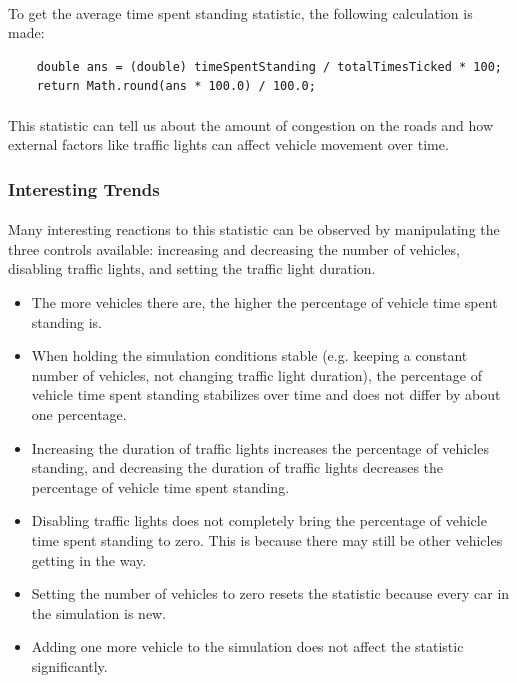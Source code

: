 \documentclass[a4paper,11pt,titlepage]{article}
\begin{document}
\paragraph{}
To get the average time spent standing statistic, the following calculation is made:
\begin{lstlisting}
	double ans = (double) timeSpentStanding / totalTimesTicked * 100;
	return Math.round(ans * 100.0) / 100.0;
\end{lstlisting}
\paragraph{}
This statistic can tell us about the amount of congestion on the roads and how external factors like traffic lights can affect vehicle movement over time.

\subsubsection{Interesting Trends}
\paragraph{}
Many interesting reactions to this statistic can be observed by manipulating the three controls available: increasing and decreasing the number of vehicles, disabling traffic lights, and setting the traffic light duration.
\begin{itemize}
\item The more vehicles there are, the higher the percentage of vehicle time spent standing is.
\item When holding the simulation conditions stable (e.g. keeping a constant number of vehicles, not changing traffic light duration), the percentage of vehicle time spent standing stabilizes over time and does not differ by about one percentage.
\item Increasing the duration of traffic lights increases the percentage of vehicles standing, and decreasing the duration of traffic lights decreases the percentage of vehicle time spent standing.
\item Disabling traffic lights does not completely bring the percentage of vehicle time spent standing to zero. This is because there may still be other vehicles getting in the way.
\item Setting the number of vehicles to zero resets the statistic because every car in the simulation is new.
\item Adding one more vehicle to the simulation does not affect the statistic significantly.
\end{itemize}
\end{document}
